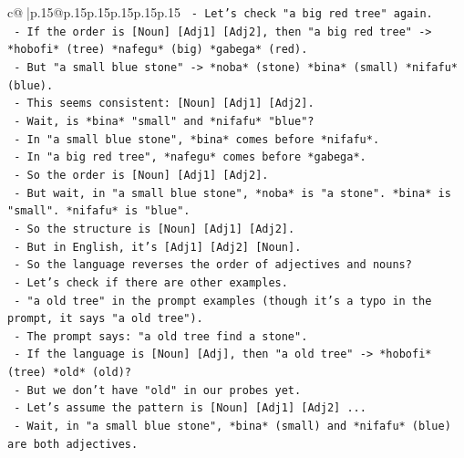 \documentclass{article}
\begin{document}
{\begin{supertabular}{c@{$\;$}|p{.15\linewidth}@{}p{.15\linewidth}p{.15\linewidth}p{.15\linewidth}p{.15\linewidth}p{.15\linewidth}}
{{{\texttt{                    {-} Let's check "a big red tree" again.} \\
\texttt{                    {-} If the order is {[}Noun{]} {[}Adj1{]} {[}Adj2{]}, then "a big red tree" {-}> *hobofi* (tree) *nafegu* (big) *gabega* (red).} \\
\texttt{                    {-} But "a small blue stone" {-}> *noba* (stone) *bina* (small) *nifafu* (blue).} \\
\texttt{                    {-} This seems consistent: {[}Noun{]} {[}Adj1{]} {[}Adj2{]}.} \\
\texttt{                    {-} Wait, is *bina* "small" and *nifafu* "blue"?} \\
\texttt{                    {-} In "a small blue stone", *bina* comes before *nifafu*.} \\
\texttt{                    {-} In "a big red tree", *nafegu* comes before *gabega*.} \\
\texttt{                    {-} So the order is {[}Noun{]} {[}Adj1{]} {[}Adj2{]}.} \\
\texttt{                    {-} But wait, in "a small blue stone", *noba* is "a stone". *bina* is "small". *nifafu* is "blue".} \\
\texttt{                    {-} So the structure is {[}Noun{]} {[}Adj1{]} {[}Adj2{]}.} \\
\texttt{                    {-} But in English, it's {[}Adj1{]} {[}Adj2{]} {[}Noun{]}.} \\
\texttt{                    {-} So the language reverses the order of adjectives and nouns?} \\
\texttt{                    {-} Let's check if there are other examples.} \\
\texttt{                    {-} "a old tree" in the prompt examples (though it's a typo in the prompt, it says "a old tree").} \\
\texttt{                    {-} The prompt says: "a old tree find a stone".} \\
\texttt{                    {-} If the language is {[}Noun{]} {[}Adj{]}, then "a old tree" {-}> *hobofi* (tree) *old* (old)?} \\
\texttt{                    {-} But we don't have "old" in our probes yet.} \\
\texttt{                    {-} Let's assume the pattern is {[}Noun{]} {[}Adj1{]} {[}Adj2{]} ...} \\
\texttt{                    {-} Wait, in "a small blue stone", *bina* (small) and *nifafu* (blue) are both adjectives.} \\
}}}
\end{supertabular}}
\end{document}
